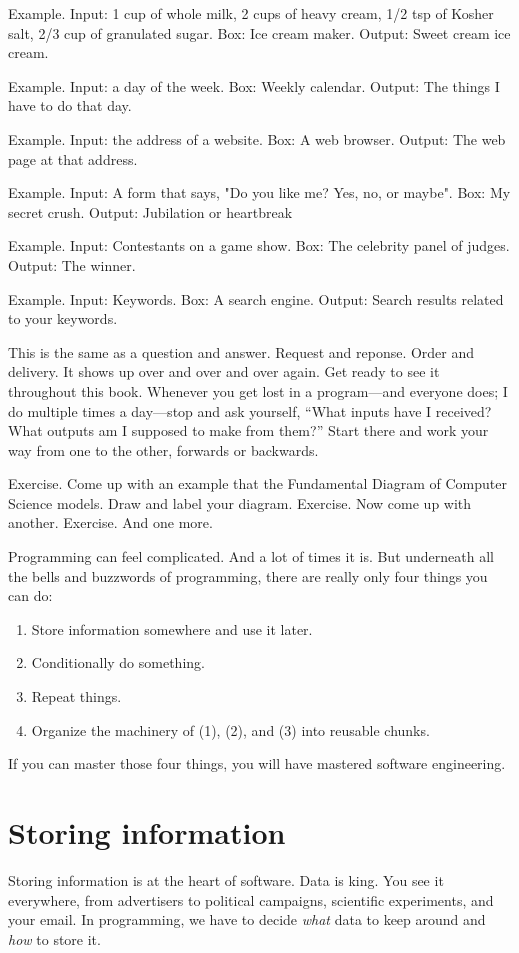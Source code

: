 Example. Input: 1 cup of whole milk, 2 cups of heavy cream, 1/2 tsp of Kosher salt, 2/3 cup of granulated sugar. Box: Ice cream maker. Output: Sweet cream ice cream.

Example. Input: a day of the week. Box: Weekly calendar. Output: The things I have to do that day.

Example. Input: the address of a website. Box: A web browser. Output: The web page at that address.

Example. Input: A form that says, "Do you like me? Yes, no, or maybe". Box: My secret crush. Output: Jubilation or heartbreak

Example. Input: Contestants on a game show. Box: The celebrity panel of judges. Output: The winner.

Example. Input: Keywords. Box: A search engine. Output: Search results related to your keywords.

This is the same as a question and answer. Request and reponse. Order and delivery. It shows up over and over and over again. Get ready to see it throughout this book. Whenever you get lost in a program---and everyone does; I do multiple times a day---stop and ask yourself, ``What inputs have I received? What outputs am I supposed to make from them?'' Start there and work your way from one to the other, forwards or backwards.

Exercise. Come up with an example that the Fundamental Diagram of Computer Science models. Draw and label your diagram.
Exercise. Now come up with another.
Exercise. And one more.


Programming can feel complicated. And a lot of times it is. But underneath all the bells and buzzwords of programming, there are really only four things you can do:

\begin{enumerate}
  \item Store information somewhere and use it later.
  \item Conditionally do something.
  \item Repeat things.
  \item Organize the machinery of (1), (2), and (3) into reusable chunks.
\end{enumerate}

If you can master those four things, you will have mastered software engineering.

\section{Storing information}
Storing information is at the heart of software. Data is king. You see it everywhere, from advertisers to political campaigns, scientific experiments, and your email. In programming, we have to decide \textit{what} data to keep around and \textit{how} to store it.

